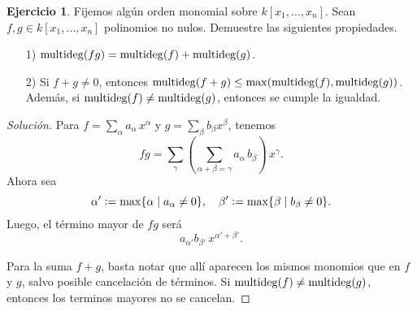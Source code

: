 \documentclass{article}
\theoremstyle{definition}
\newtheorem{ejerc}{Ejercicio}
\newenvironment{solucion}{\begin{proof}[Solución]}{\end{proof}}
\begin{document}
\begin{ejerc}
  Fijemos algún orden monomial sobre $k [x_1,\ldots,x_n]$. Sean
  $f,g \in k [x_1,\ldots,x_n]$ polinomios no nulos. Demuestre las siguientes
  propiedades.

  \begin{enumerate}
  \item[1)] $\operatorname{multideg}(fg) = \operatorname{multideg}(f) + \operatorname{multideg}(g)$.

  \item[2)] Si $f+g\ne 0$, entonces
    $\operatorname{multideg} (f + g) \le \max (\operatorname{multideg}(f), \operatorname{multideg}(g))$. Además, si
    $\operatorname{multideg}(f) \ne \operatorname{multideg}(g)$, entonces se cumple la igualdad.
  \end{enumerate}

  \ifdefined\solutions\begin{solucion}

    Para $f = \sum_\alpha a_\alpha\,x^\alpha$ y
    $g = \sum_\beta b_\beta x^\beta$, tenemos
    $$fg = \sum_\gamma \left(\sum_{\alpha+\beta = \gamma} a_\alpha \, b_\beta\right)\,x^\gamma.$$
    Ahora sea
    \[ \alpha' \mathrel{\mathop:}= \max \{ \alpha \mid a_\alpha \ne 0 \}, \quad
       \beta' \mathrel{\mathop:}= \max \{ \beta \mid b_\beta \ne 0 \}. \]
    Luego, el término mayor de $fg$ será
    $$a_{\alpha'} b_{\beta'} \, x^{\alpha' + \beta'}.$$

    Para la suma $f+g$, basta notar que allí aparecen los mismos monomios que en
    $f$ y $g$, salvo posible cancelación de términos.
    Si $\operatorname{multideg}(f) \ne \operatorname{multideg}(g)$, entonces los terminos mayores no se
    cancelan.
  \end{solucion}\fi
\end{ejerc}
\end{document}
